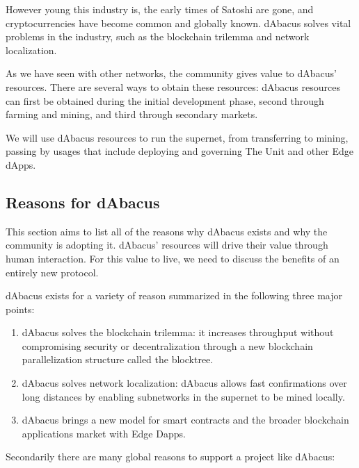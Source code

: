 \documentclass[12pt]{article}
\begin{document}
However young this industry is, the early times of Satoshi are gone, and cryptocurrencies have become common and globally known. dAbacus solves vital problems in the industry, such as the blockchain trilemma and network localization. 

As we have seen with other networks, the community gives value to dAbacus' resources. There are several ways to obtain these resources: dAbacus resources can first be obtained during the initial development phase, second through farming and mining, and third through secondary markets. 

We will use dAbacus resources to run the supernet, from transferring to mining, passing by usages that include deploying and governing The Unit and other Edge dApps.


\subsection{Reasons for dAbacus}

This section aims to list all of the reasons why dAbacus exists and why the community is adopting it. dAbacus' resources will drive their value through human interaction. For this value to live, we need to discuss the benefits of an entirely new protocol.

dAbacus exists for a variety of reason summarized in the following three major points:

\begin{enumerate}

\item dAbacus solves the blockchain trilemma: it increases throughput without compromising security or decentralization through a new blockchain parallelization structure called the blocktree.

\item dAbacus solves network localization: dAbacus allows fast confirmations over long distances by enabling subnetworks in the supernet to be mined locally. 

\item dAbacus brings a new model for smart contracts and the broader blockchain applications market with Edge Dapps.

\end{enumerate}

Secondarily there are many global reasons to support a project like dAbacus:
\end{document}
